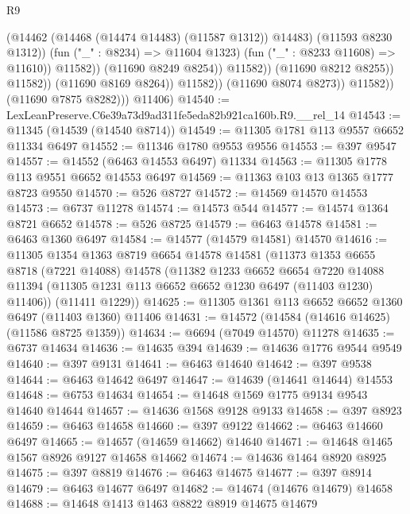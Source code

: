\begin{lexlean}{R9}
\begin{coremodule}
                                          (@14462 (@14468 (@14474 @14483) (@11587 @1312)) @14483)
                                          (@11593 @8230 @1312))
                                        (fun ("_" : @8234) => @11604 @1323)
                                        (fun ("_" : @8233 @11608) => @11610))
                                      @11582))
                                  (@11690 @8249 @8254))
                                @11582))
                            (@11690 @8212 @8255))
                          @11582))
                      (@11690 @8169 @8264))
                    @11582))
                (@11690 @8074 @8273))
              @11582))
          (@11690 @7875 @8282)))
      @11406)
@14540 := LexLeanPreserve.C6e39a73d9ad311fe5eda82b921ca160b.R9.__rel_14
@14543 := @11345 (@14539 (@14540 @8714))
@14549 := @11305 @1781 @113 @9557 @6652 @11334 @6497
@14552 := @11346 @1780 @9553 @9556
@14553 := @397 @9547
@14557 := @14552 (@6463 @14553 @6497) @11334
@14563 := @11305 @1778 @113 @9551 @6652 @14553 @6497
@14569 := @11363 @103 @13 @1365 @1777 @8723 @9550
@14570 := @526 @8727
@14572 := @14569 @14570 @14553
@14573 := @6737 @11278
@14574 := @14573 @544
@14577 := @14574 @1364 @8721 @6652
@14578 := @526 @8725
@14579 := @6463 @14578
@14581 := @6463 @1360 @6497
@14584 := @14577 (@14579 @14581) @14570
@14616 := @11305
    @1354
    @1363
    @8719
    @6654
    @14578
    @14581
    (@11373
      @1353
      @6655
      @8718
      (@7221 @14088)
      @14578
      (@11382
        @1233
        @6652
        @6654
        @7220
        @14088
        @11394
        (@11305 @1231 @113 @6652 @6652 @1230 @6497 (@11403 @1230) @11406))
      (@11411 @1229))
@14625 := @11305 @1361 @113 @6652 @6652 @1360 @6497 (@11403 @1360) @11406
@14631 := @14572 (@14584 (@14616 @14625) (@11586 @8725 @1359))
@14634 := @6694 (@7049 @14570) @11278
@14635 := @6737 @14634
@14636 := @14635 @394
@14639 := @14636 @1776 @9544 @9549
@14640 := @397 @9131
@14641 := @6463 @14640
@14642 := @397 @9538
@14644 := @6463 @14642 @6497
@14647 := @14639 (@14641 @14644) @14553
@14648 := @6753 @14634
@14654 := @14648 @1569 @1775 @9134 @9543 @14640 @14644
@14657 := @14636 @1568 @9128 @9133
@14658 := @397 @8923
@14659 := @6463 @14658
@14660 := @397 @9122
@14662 := @6463 @14660 @6497
@14665 := @14657 (@14659 @14662) @14640
@14671 := @14648 @1465 @1567 @8926 @9127 @14658 @14662
@14674 := @14636 @1464 @8920 @8925
@14675 := @397 @8819
@14676 := @6463 @14675
@14677 := @397 @8914
@14679 := @6463 @14677 @6497
@14682 := @14674 (@14676 @14679) @14658
@14688 := @14648 @1413 @1463 @8822 @8919 @14675 @14679

\end{coremodule}
\end{lexlean}
